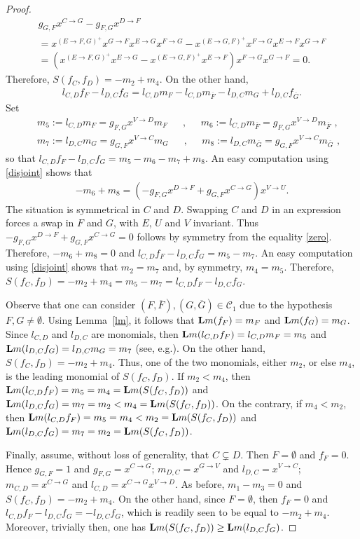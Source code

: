 \documentclass[10pt]{amsart}
\newcommand{\eg}{e.g.}
\newcommand{\lm}{\mbox{${\bf L}{\rm m}$}}
\newcommand{\mcc}{\mbox{$\mathcal{C}$}}
\theoremstyle{definition}
\theoremstyle{remark}
\begin{document}
\begin{proof}
\begin{multline}\label{zero}
g_{G,F}x^{C\to G}-g_{F,G}x^{D\to F}\\
=x^{(E\to F,G)^{+}}x^{G\to F}x^{E\to G}x^{F\to G}-
x^{(E\to G,F)^{+}}x^{F\to G}x^{E\to F}x^{G\to F}\\
=(x^{(E\to F,G)^{+}}x^{E\to G}-x^{(E\to G,F)^{+}}x^{E\to F})x^{F\to G}x^{G\to F}=0.
\end{multline}
Therefore, $S(f_C,f_D)=-m_2+m_4$. On the other hand,
\begin{eqnarray*}
l_{C,D}f_F-l_{D,C}f_G=l_{C,D}m_F-l_{C,D}m_{\overline{F}}-
l_{D,C}m_G+l_{D,C}f_{\overline{G}}.
\end{eqnarray*}
Set
\begin{eqnarray*}
&&m_5:=l_{C,D}m_{F}=g_{F,G}x^{V\to D}m_F\phantom{+}\mbox{ ,
  }\phantom{+} m_6:=l_{C,D}m_{\overline{F}}=g_{F,G}x^{V\to
    D}m_{\overline{F}}\mbox{ , }\\&& m_7:=l_{D,C}m_G=g_{G,F}x^{V\to
    C}m_G\phantom{+}\mbox{ ,
  }\phantom{+}m_8:=l_{D,C}m_{\overline{G}}=g_{G,F}x^{V\to
    C}m_{\overline{G}}\mbox{ , }
\end{eqnarray*}
so that $l_{C,D}f_F-l_{D,C}f_G=m_5-m_6-m_7+m_8$. An easy computation
using \eqref{disjoint} shows that
\begin{eqnarray*}
-m_6+m_8=(-g_{F,G}x^{D\to F}+g_{G,F}x^{C\to G})x^{V\to U}.
\end{eqnarray*}
The situation is symmetrical in $C$ and $D$. Swapping $C$ and $D$ in
an expression forces a swap in $F$ and $G$, with $E$, $U$ and $V$
invariant. Thus $-g_{F,G}x^{D\to F}+g_{G,F}x^{C\to G}=0$ follows by
symmetry from the equality \eqref{zero}. Therefore, $-m_6+m_8=0$ and
$l_{C,D}f_F-l_{D,C}f_G=m_5-m_7$. An easy computation using
\eqref{disjoint} shows that $m_2=m_7$ and, by symmetry,
$m_4=m_5$. Therefore,
$S(f_C,f_D)=-m_2+m_4=m_5-m_7=l_{C,D}f_F-l_{D,C}f_G$.

Observe that one can consider
$(F,\overline{F}),(G,\overline{G})\in\mcc_1$ due to the hypothesis
$F,G\neq\emptyset$. Using Lemma~\ref{lm}, it follows that
$\lm(f_F)=m_F$ and $\lm(f_G)=m_G$. Since $l_{C,D}$ and $l_{D,C}$ are
monomials, then $\lm(l_{C,D}f_F)=l_{C,D}m_F=m_5$ and
$\lm(l_{D,C}f_G)=l_{D,C}m_G=m_7$ (see, \eg \cite[\S2.2,
  Exercise~11]{clo}).  On the other hand, $S(f_C,f_D)=-m_2+m_4$. Thus,
one of the two monomials, either $m_2$, or else $m_4$, is the leading
monomial of $S(f_C,f_D)$. If $m_2<m_4$, then
$\lm(l_{C,D}f_F)=m_5=m_4=\lm(S(f_C,f_D))$ and
$\lm(l_{D,C}f_G)=m_7=m_2<m_4=\lm(S(f_C,f_D))$. On the contrary, if
$m_4<m_2$, then $\lm(l_{C,D}f_F)=m_5=m_4<m_2=\lm(S(f_C,f_D))$ and
$\lm(l_{D,C}f_G)=m_7=m_2=\lm(S(f_C,f_D))$.

Finally, assume, without loss of generality, that $C\subsetneq
D$. Then $F=\emptyset$ and $f_F=0$. Hence $g_{G,F}=1$ and
$g_{F,G}=x^{C\to G}$; $m_{D,C}=x^{G\to V}$ and $l_{D,C}=x^{V\to C}$;
$m_{C,D}=x^{C\to G}$ and $l_{C,D}=x^{C\to G}x^{V\to D}$. As before,
$m_1-m_3=0$ and $S(f_C,f_D)=-m_2+m_4$. On the other hand, since
$F=\emptyset$, then $f_F=0$ and $l_{C,D}f_F-l_{D,C}f_G=-l_{D,C}f_G$,
which is readily seen to be equal to $-m_2+m_4$. Moreover, trivially
then, one has $\lm(S(f_C,f_D))\geq\lm(l_{D,C}f_G)$.
\end{proof}
\end{document}
